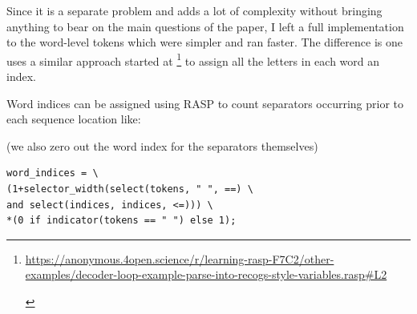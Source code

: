\documentclass[11pt]{article}
\begin{document}
Since it is a separate problem and adds a lot of complexity without bringing anything to bear on the main questions of the paper, I left a full implementation to the word-level tokens which were simpler and ran faster. The difference is one uses a similar approach started at \footnote{\begin{footnotesize}\href{https://anonymous.4open.science/r/learning-rasp-F7C2/other-examples/decoder-loop-example-parse-into-recogs-style-variables.rasp\#L2}{https://anonymous.4open.science/r/learning-rasp-F7C2/other-examples/decoder-loop-example-parse-into-recogs-style-variables.rasp\#L2}\end{footnotesize}} to assign all the letters in each word an index. 

Word indices can be assigned using RASP to count separators occurring prior to each sequence location like:

(we also zero out the word index for the separators themselves)

\begin{tiny}
\begin{verbatim}
word_indices = \
(1+selector_width(select(tokens, " ", ==) \
and select(indices, indices, <=))) \
*(0 if indicator(tokens == " ") else 1);
\end{verbatim}
\end{tiny}
\end{document}
